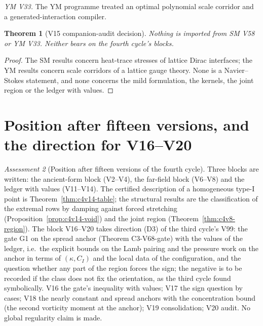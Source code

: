 \documentclass[11pt]{article}
\theoremstyle{plain}
\newtheorem{theorem}{Theorem}[section]
\theoremstyle{definition}
\theoremstyle{remark}
\newtheorem{assessment}[theorem]{Assessment}
\begin{document}
\emph{YM V33.}  The YM programme treated an optimal polynomial scale
corridor and a generated-interaction compiler.

\begin{theorem}[V15 companion-audit decision]
\label{thm:c4v15-companion-decision}
Nothing is imported from SM V58 or YM V33.  Neither bears on the
fourth cycle's blocks.
\end{theorem}

\begin{proof}
The SM results concern heat-trace stresses of lattice Dirac
interfaces; the YM results concern scale corridors of a lattice
gauge theory.  None is a Navier--Stokes statement, and none concerns
the mild formulation, the kernels, the joint region or the ledger
with values.
\end{proof}

\section{Position after fifteen versions, and the direction for V16--V20}
\label{sec:c4v15-position}

\begin{assessment}[Position after fifteen versions of the fourth cycle]
\label{ass:c4v15-position-fifteen}
Three blocks are written: the ancient-form block (V2--V4), the
far-field block (V6--V8) and the ledger with values (V11--V14).  The
certified description of a homogeneous type-I point is
Theorem~\ref{thm:c4v14-table}; the structural results are the
classification of the extremal rows by damping against forced
stretching (Proposition~\ref{prop:c4v14-void}) and the joint region
(Theorem~\ref{thm:c4v8-region}).  The block V16--V20 takes direction (D3)
of the third cycle's V99: the gate G1 on the spread anchor
(Theorem C3-V68-gate) with the values of the ledger, i.e.\ the
explicit bounds on the Lamb pairing and the pressure work on the
anchor in terms of \((\kappa,C_I)\) and the local data of the configuration,
and the question whether any part of the region forces the sign;
the negative is to be recorded if the class does not fix the
orientation, as the third cycle found symbolically.  V16 the gate's
inequality with values; V17 the sign question by cases; V18 the
nearly constant and spread anchors with the concentration bound
(the second vorticity moment at the anchor); V19 consolidation; V20
audit.  No global regularity claim is made.
\end{assessment}
\end{document}
